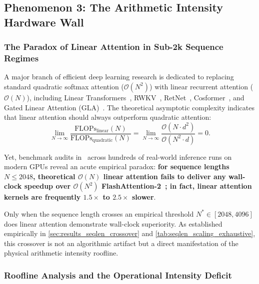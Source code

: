 \subsection{Phenomenon 3: The Arithmetic Intensity Hardware Wall}
\label{sec:phenom_arithmetic_intensity_wall}

\subsubsection{The Paradox of Linear Attention in Sub-2k Sequence Regimes}
\label{sec:phenom_linear_paradox}

A major branch of efficient deep learning research is dedicated to replacing standard quadratic softmax attention ($\mathcal{O}(N^2)$) with linear recurrent attention ($\mathcal{O}(N)$), including Linear Transformers~\cite{katharopoulos2020transformers}, RWKV~\cite{peng2023rwkv}, RetNet~\cite{sun2023retentive}, Cosformer~\cite{qin2022cosformer}, and Gated Linear Attention (GLA)~\cite{yang2024gated}. The theoretical asymptotic complexity indicates that linear attention should always outperform quadratic attention:
\begin{equation}
\lim_{N \to \infty} \frac{\text{FLOPs}_{\text{linear}}(N)}{\text{FLOPs}_{\text{quadratic}}(N)} = \lim_{N \to \infty} \frac{\mathcal{O}(N \cdot d^2)}{\mathcal{O}(N^2 \cdot d)} = 0.
\end{equation}

Yet, benchmark audits in \neuralops\ across hundreds of real-world inference runs on modern GPUs reveal an acute empirical paradox: \textbf{for sequence lengths $N \le 2048$, theoretical $\mathcal{O}(N)$ linear attention fails to deliver any wall-clock speedup over $\mathcal{O}(N^2)$ FlashAttention-2~\cite{dao2023flashattention2}; in fact, linear attention kernels are frequently $1.5\times$ to $2.5\times$ slower}. 

Only when the sequence length crosses an empirical threshold $N^* \in [2048, 4096]$ does linear attention demonstrate wall-clock superiority. As established empirically in \cref{sec:results_seqlen_crossover} and \cref{tab:seqlen_scaling_exhaustive}, this crossover is not an algorithmic artifact but a direct manifestation of the physical arithmetic intensity roofline.

\subsubsection{Roofline Analysis and the Operational Intensity Deficit}
\label{sec:phenom_roofline_analysis}

